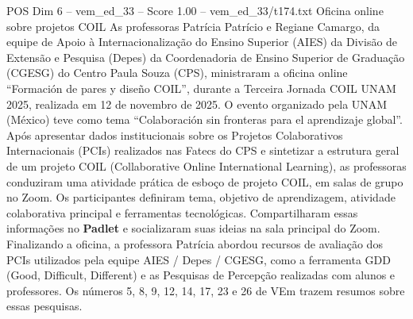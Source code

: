 \begin{textsample}{POS Dim 6 – vem\_ed\_33 – Score 1.00 – vem\_ed\_33/t174.txt}  \label{ex:f6_pos_069}
Oficina online sobre projetos COIL As professoras Patrícia Patrício e Regiane Camargo, da equipe de Apoio à Internacionalização do Ensino Superior (AIES) da Divisão de Extensão e Pesquisa (Depes) da Coordenadoria de Ensino Superior de Graduação (CGESG) do Centro Paula Souza (CPS), ministraram a oficina online “Formación de pares y diseño COIL”, durante a Terceira Jornada COIL UNAM 2025, realizada em 12 de novembro de 2025.
O evento organizado pela UNAM (México) teve como tema “Colaboración sin fronteras para el aprendizaje global”.
Após apresentar dados institucionais sobre os Projetos Colaborativos Internacionais (PCIs) realizados nas Fatecs do CPS e sintetizar a estrutura geral de um projeto COIL (Collaborative Online International Learning), as professoras conduziram uma atividade prática de esboço de projeto COIL, em salas de grupo no Zoom.
Os participantes definiram tema, objetivo de aprendizagem, atividade colaborativa principal e ferramentas tecnológicas.
Compartilharam essas informações no \textbf{Padlet} e socializaram suas ideias na sala principal do Zoom.
Finalizando a oficina, a professora Patrícia abordou recursos de avaliação dos PCIs utilizados pela equipe AIES / Depes / CGESG, como a ferramenta GDD (Good, Difficult, Different) e as Pesquisas de Percepção realizadas com alunos e professores.
Os números 5, 8, 9, 12, 14, 17, 23 e 26 de VEm trazem resumos sobre essas pesquisas.

\end{textsample}
